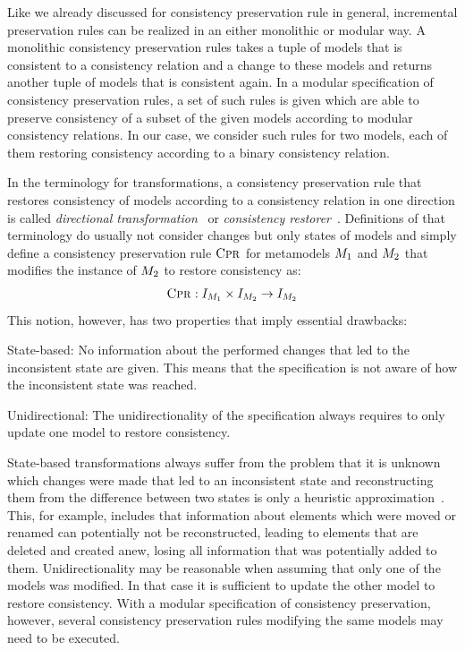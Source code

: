 Like we already discussed for consistency preservation rule in general, incremental preservation rules can be realized in an either monolithic or modular way.
A monolithic consistency preservation rules takes a tuple of models that is consistent to a consistency relation and a change to these models and returns another tuple of models that is consistent again.
In a modular specification of consistency preservation rules, a set of such rules is given which are able to preserve consistency of a subset of the given models according to modular consistency relations.
In our case, we consider such rules for two models, each of them restoring consistency according to a binary consistency relation.

In the terminology for transformations, a consistency preservation rule that restores consistency of models according to a consistency relation in one direction is called \emph{directional transformation}~\cite{stevens2010sosym} or \emph{consistency restorer}~\cite{stevens2020BidirectionalTransformationLarge-SoSym}.
Definitions of that terminology do usually not consider changes but only states of models and simply define a consistency preservation rule $\textsc{Cpr}_{}$ for metamodels $M_{1}$ and $M_{2}$ that modifies the instance of $M_{2}$ to restore consistency as:
\begin{align*}
    \textsc{Cpr}_{}: I_{M_{1}} \times I_{M_{2}} \rightarrow I_{M_{2}}
\end{align*}
This notion, however, has two properties that imply essential drawbacks:
\begin{properdescription}
    \item[State-based:] No information about the performed changes that led to the inconsistent state are given. This means that the specification is not aware of how the inconsistent state was reached.
    \item[Unidirectional:] The unidirectionality of the specification always requires to only update one model to restore consistency.
\end{properdescription}
State-based transformations always suffer from the problem that it is unknown which changes were made that led to an inconsistent state and reconstructing them from the difference between two states is only a heuristic approximation~\cite{diskin2011StateToDeltaSymmetric-MODELS}.
This, for example, includes that information about elements which were moved or renamed can potentially not be reconstructed, leading to elements that are deleted and created anew, losing all information that was potentially added to them.
Unidirectionality may be reasonable when assuming that only one of the models was modified. In that case it is sufficient to update the other model to restore consistency.
With a modular specification of consistency preservation, however, several consistency preservation rules modifying the same models may need to be executed.

